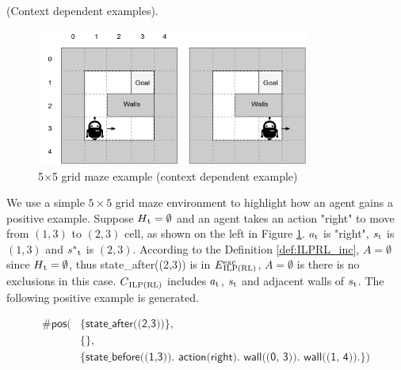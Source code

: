\begin{examp} \normalfont (Context dependent examples).

\begin{figure}[!htb]
\centering
\includegraphics[width=0.8\textwidth]{./figures/pipeline_example1}
\caption{5$\times$5 grid maze example (context dependent example)}
\label{example_pos_example}
\end{figure}

We use a simple $5 \times 5$ grid maze environment to highlight how an agent gains a positive example.
Suppose $H\textsubscript{t}=\emptyset$ and an agent takes an action "right" to move from $(1,3)$ to $(2,3)$ cell, as shown on the left in Figure \ref{example_pos_example}.
$a\textsubscript{t}$ is "right", $s\textsubscript{t}$ is $(1,3)$ and $s^*\textsubscript{t}$ is $(2,3)$.
According to the Definition \ref{def:ILPRL_inc}, $A=\emptyset$ since $H\textsubscript{t}=\emptyset$, thus \textsf{state\_after((2,3))} is in $E\SPSB{exc}{ILP(RL)}$, $A=\emptyset$ is there is no exclusions in this case.
$C\textsubscript{ILP(RL)}$ includes $a\textsubscript{t}$, $s\textsubscript{t}$ and adjacent walls of $s\textsubscript{t}$.
The following positive example is generated.

\begin{equation}
\begin{split}
    \textsf{\#pos(} & \textsf{\{state\_after((2,3))\},}\\
                    & \textsf{\{\},} \\
    & \textsf{\{state\_before((1,3)). action(right). wall((0, 3)). wall((1, 4)).\})}
\end{split}
\end{equation}


\end{examp}
